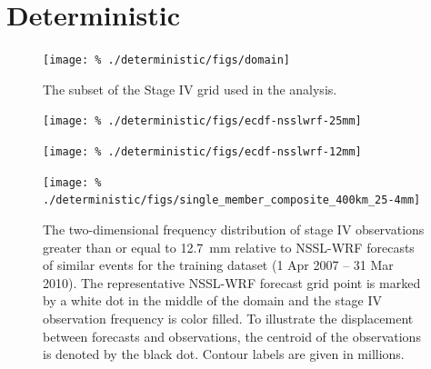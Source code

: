 

\chapter{Deterministic}
\label{deterministic}









\clearpage
\begin{figure}[cc]
    \centering
    \texttt{[image: \%
    ./deterministic/figs/domain]}\\
    \caption{The subset of the Stage IV grid used in the analysis.}
    \label{domain}
\end{figure}


\clearpage
\begin{figure}[cc]
    \centering
    \texttt{[image: \%
    ./deterministic/figs/ecdf-nsslwrf-25mm]}\\
    \caption{}
    \label{nssl_25quant}
\end{figure}


\begin{figure}[cc]
    \centering
    \texttt{[image: \%
    ./deterministic/figs/ecdf-nsslwrf-12mm]}\\
    \caption{}
    \label{nssl_12quant}
\end{figure}


\clearpage
\begin{figure}[cc]
    \centering
    \texttt{[image: \%
    ./deterministic/figs/single\_member\_composite\_400km\_25-4mm]}\\
    \caption{The two-dimensional frequency distribution of stage IV observations greater than or equal to \mbox{12.7 mm} relative to NSSL-WRF forecasts of similar events for the training dataset (1 Apr 2007 -- 31 Mar 2010).
    The representative NSSL-WRF forecast grid point is marked by a white dot in the middle of the domain and the stage IV observation frequency is color filled.
    To illustrate the displacement between forecasts and observations, the centroid of the observations is denoted by the black dot.
    Contour labels are given in millions.}
    \label{single_25thresh}
\end{figure}


